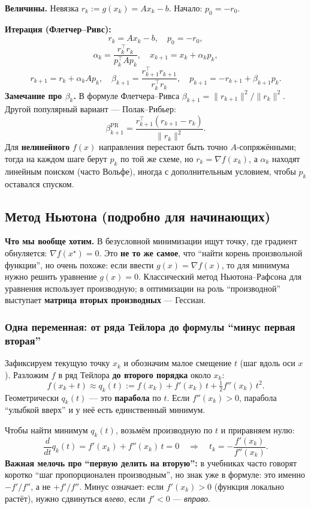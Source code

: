 \documentclass[12pt,a4paper]{article}
\newcommand{\grad}{\nabla}
\begin{document}
\textbf{Величины.} Невязка \(r_k:=g(x_k)=Ax_k-b\). Начало: \(p_0=-r_0\).

\textbf{Итерация (Флетчер--Ривс):}
\[
  r_k=Ax_k-b,\quad p_0=-r_0,
\]
\[
  \alpha_k=\frac{r_k^\top r_k}{p_k^\top A p_k},\quad x_{k+1}=x_k+\alpha_k p_k,
\]
\[
  r_{k+1}=r_k+\alpha_k A p_k,\quad
  \beta_{k+1}=\frac{r_{k+1}^\top r_{k+1}}{r_k^\top r_k},\quad
  p_{k+1}=-r_{k+1}+\beta_{k+1}p_k.
\]
\textbf{Замечание про \(\beta_k\).} В формуле Флетчера--Ривса \(\beta_{k+1}=\|r_{k+1}\|^2/\|r_k\|^2\). Другой популярный вариант --- Полак--Рибьер:
\[
  \beta_{k+1}^{\mathrm{PR}}=\frac{r_{k+1}^\top(r_{k+1}-r_k)}{\|r_k\|^2}.
\]
Для \textbf{нелинейного} \(f(x)\) направления перестают быть точно \(A\)-сопряжёнными; тогда на каждом шаге берут \(p_k\) по той же схеме, но \(r_k=\grad f(x_k)\), а \(\alpha_k\) находят линейным поиском (часто Вольфе), иногда с дополнительным условием, чтобы \(p_k\) оставался спуском.

\subsection{Метод Ньютона (подробно для начинающих)}
\textbf{Что мы вообще хотим.} В безусловной минимизации ищут точку, где градиент обнуляется: \(\grad f(x^\star)=0\). Это \textbf{не то же самое}, что ``найти корень произвольной функции'', но очень похоже: если ввести \(g(x)=\grad f(x)\), то для минимума нужно решить уравнение \(g(x)=0\). Классический метод Ньютона--Рафсона для уравнения использует производную; в оптимизации на роль ``производной'' выступает \textbf{матрица вторых производных} --- Гессиан.

\subsubsection{Одна переменная: от ряда Тейлора до формулы ``минус первая вторая''}
Зафиксируем текущую точку \(x_k\) и обозначим малое смещение \(t\) (шаг вдоль оси \(x\)). Разложим \(f\) в ряд Тейлора \textbf{до второго порядка} около \(x_k\):
\[
  f(x_k+t)\approx q_k(t):= f(x_k)+f'(x_k)\,t+\tfrac12 f''(x_k)\,t^2.
\]
Геометрически \(q_k(t)\) --- это \textbf{парабола} по \(t\). Если \(f''(x_k)>0\), парабола ``улыбкой вверх'' и у неё есть единственный минимум.

Чтобы найти минимум \(q_k(t)\), возьмём производную по \(t\) и приравняем нулю:
\[
  \frac{d}{dt}q_k(t)= f'(x_k)+f''(x_k)\,t = 0
  \quad\Rightarrow\quad
  t_k=-\frac{f'(x_k)}{f''(x_k)}.
\]
\textbf{Важная мелочь про ``первую делить на вторую'':} в учебниках часто говорят коротко ``шаг пропорционален производным'', но знак уже в формуле: это именно \(-f'/f''\), а не \(+f'/f''\). Минус означает: если \(f'(x_k)>0\) (функция локально растёт), нужно сдвинуться \emph{влево}, если \(f'<0\) --- \emph{вправо}.
\end{document}
